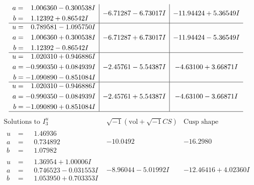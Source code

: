 \documentclass[1p]{elsarticle_modified}
\theoremstyle{definition}
\newcommand{\I}{\sqrt{-1}}
\begin{document}
$$\begin{array}{c|c|c}
\begin{aligned}
a &= \phantom{-}1.006360 - 0.300538 I \\
b &= \phantom{-}1.12392 + 0.86542 I\end{aligned}
 & -6.71287 - 6.73017 I & -11.94424 + 5.36549 I \\ \hline\begin{aligned}
u &= \phantom{-}0.789581 - 1.095750 I \\
a &= \phantom{-}1.006360 + 0.300538 I \\
b &= \phantom{-}1.12392 - 0.86542 I\end{aligned}
 & -6.71287 + 6.73017 I & -11.94424 - 5.36549 I \\ \hline\begin{aligned}
u &= \phantom{-}1.020310 + 0.946886 I \\
a &= -0.990350 + 0.084939 I \\
b &= -1.090890 - 0.851084 I\end{aligned}
 & -2.45761 - 5.54387 I & -4.63100 + 3.66871 I \\ \hline\begin{aligned}
u &= \phantom{-}1.020310 - 0.946886 I \\
a &= -0.990350 - 0.084939 I \\
b &= -1.090890 + 0.851084 I\end{aligned}
 & -2.45761 + 5.54387 I & -4.63100 - 3.66871 I\\
 \hline 
 \end{array}$$\newpage$$\begin{array}{c|c|c}  
\text{Solutions to }I^u_{3}& \I (\text{vol} + \sqrt{-1}CS) & \text{Cusp shape}\\
 \hline 
\begin{aligned}
u &= \phantom{-}1.46936\phantom{ +0.000000I} \\
a &= \phantom{-}0.734892\phantom{ +0.000000I} \\
b &= \phantom{-}1.07982\phantom{ +0.000000I}\end{aligned}
 & -10.0492\phantom{ +0.000000I} & -16.2980\phantom{ +0.000000I} \\ \hline\begin{aligned}
u &= \phantom{-}1.36954 + 1.00006 I \\
a &= \phantom{-}0.746523 - 0.031553 I \\
b &= \phantom{-}1.053950 + 0.703353 I\end{aligned}
 & -8.96044 - 5.01992 I & -12.46416 + 4.02360 I \\ \hline\begin{aligned}

\end{aligned}
\end{array}$$
\end{document}
